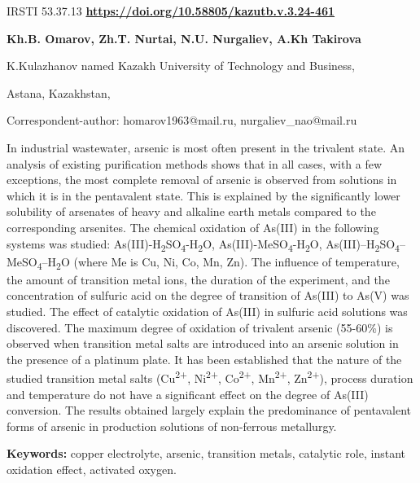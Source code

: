 \newpage
IRSTI 53.37.13
\hfill {\bfseries \href{https://doi.org/10.58805/kazutb.v.3.24-461}{https://doi.org/10.58805/kazutb.v.3.24-461}}


\begin{center}
{\bfseries Kh.B. Omarov\envelope, Zh.T. Nurtai, N.U.
Nurgaliev\envelope, A.Kh Takirova}

K.Kulazhanov named Kazakh University of Technology and Business,

Astana, Kazakhstan,
\end{center}

\envelope Correspondent-author: homarov1963@mail.ru,
nurgaliev\_nao@mail.ru

In industrial wastewater, arsenic is most often present in the trivalent
state. An analysis of existing purification methods shows that in all
cases, with a few exceptions, the most complete removal of arsenic is
observed from solutions in which it is in the pentavalent state. This is
explained by the significantly lower solubility of arsenates of heavy
and alkaline earth metals compared to the corresponding arsenites. The
chemical oxidation of As(III) in the following systems was studied:
As(III)-H\textsubscript{2}SO\textsubscript{4}-H\textsubscript{2}O,
As(III)-MeSO\textsubscript{4}-H\textsubscript{2}O,
As(III)--H\textsubscript{2}SO\textsubscript{4}--MeSO\textsubscript{4}--H\textsubscript{2}O
(where Me is Cu, Ni, Co, Mn, Zn). The influence of temperature, the
amount of transition metal ions, the duration of the experiment, and the
concentration of sulfuric acid on the degree of transition of As(III) to
As(V) was studied. The effect of catalytic oxidation of As(III) in
sulfuric acid solutions was discovered. The maximum degree of oxidation
of trivalent arsenic (55-60\%) is observed when transition metal salts
are introduced into an arsenic solution in the presence of a platinum
plate. It has been established that the nature of the studied transition
metal salts (Cu\textsuperscript{2+}, Ni\textsuperscript{2+},
Co\textsuperscript{2+}, Mn\textsuperscript{2+}, Zn\textsuperscript{2+}),
process duration and temperature do not have a significant effect on the
degree of As(III) conversion. The results obtained largely explain the
predominance of pentavalent forms of arsenic in production solutions of
non-ferrous metallurgy.

{\bfseries Keywords:} copper electrolyte, arsenic, transition metals,
catalytic role, instant oxidation effect, activated oxygen.

